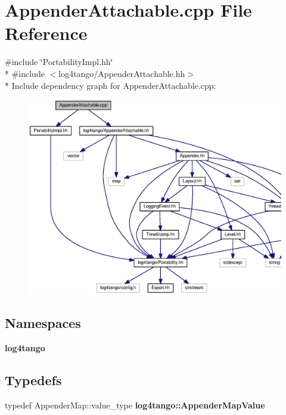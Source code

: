 \section{Appender\-Attachable.\-cpp File Reference}
\label{AppenderAttachable_8cpp}
{\ttfamily \#include \char`\"{}Portability\-Impl.\-hh\char`\"{}}\\*
{\ttfamily \#include $<$log4tango/\-Appender\-Attachable.\-hh$>$}\\*
Include dependency graph for Appender\-Attachable.\-cpp\-:
\nopagebreak
\begin{figure}[H]
\begin{center}
\leavevmode
\includegraphics[width=350pt]{df/dcc/AppenderAttachable_8cpp__incl}
\end{center}
\end{figure}
\subsection*{Namespaces}
\begin{DoxyCompactItemize}
\item 
{\bf log4tango}
\end{DoxyCompactItemize}
\subsection*{Typedefs}
\begin{DoxyCompactItemize}
\item 
typedef Appender\-Map\-::value\-\_\-type {\bf log4tango\-::\-Appender\-Map\-Value}
\end{DoxyCompactItemize}
